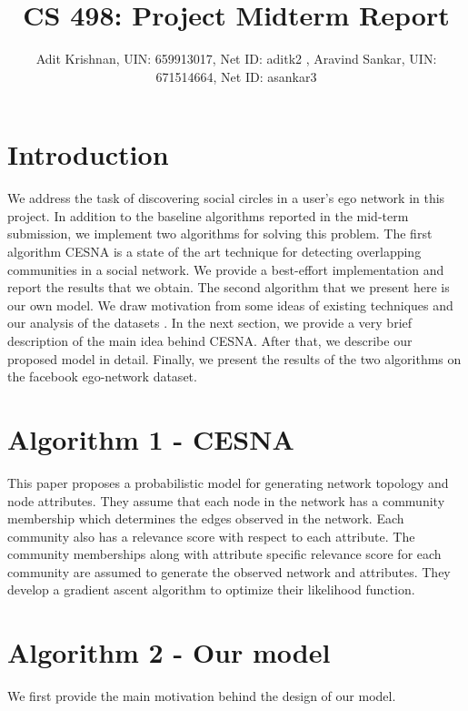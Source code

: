 \documentclass[11pt]{article}
\begin{document}
 
 
 
\title{CS 498: Project Midterm Report}%
\author{Adit Krishnan, UIN: 659913017, Net ID: aditk2 , Aravind Sankar, UIN: 671514664, Net ID: asankar3 \\} %
\maketitle


\section{Introduction}
We address the task of discovering social circles in a user's ego network in this project.  In addition to the baseline algorithms reported in the mid-term submission, we implement two algorithms for solving this problem. The first algorithm CESNA \cite{cesna} is a state of the art technique for detecting overlapping communities in a social network. We provide a best-effort implementation and report the results that we obtain. The second algorithm that we present here is our own model. We draw motivation from some ideas of existing techniques and our analysis of the datasets \cite{SNAP dataset}.
In the next section, we provide a very brief description of the main idea behind CESNA. 
After that, we describe our proposed model in detail. Finally, we present the results of the two algorithms on the facebook ego-network dataset.

\section{Algorithm 1 - CESNA}
This paper proposes a probabilistic model for generating network topology and node attributes. They assume that each node in the network has a community membership which determines the edges observed in the network. Each community also has a relevance score with respect to each attribute. The community memberships along with attribute specific relevance score for each community are assumed to generate the observed network and attributes. They develop a gradient ascent algorithm to optimize their likelihood function.
\section{Algorithm 2 - Our model}
We first provide the main motivation behind the design of our model.
\end{document}
